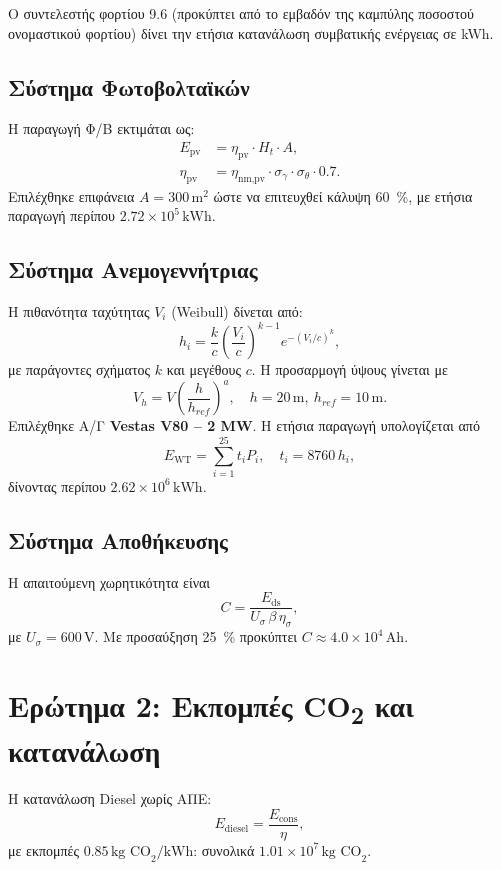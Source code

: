 \documentclass[10pt,a4paper]{article}
\begin{document}
Ο συντελεστής φορτίου 9.6 (προκύπτει από το εμβαδόν της καμπύλης ποσοστού ονομαστικού φορτίου) δίνει την ετήσια κατανάλωση συμβατικής ενέργειας σε kWh.

\subsection{Σύστημα Φωτοβολταϊκών}
Η παραγωγή Φ/Β εκτιμάται ως:
\begin{align}
E_{\text{pv}} &= \eta_{\text{pv}} \cdot H_t \cdot A,\\
\eta_{\text{pv}} &= \eta_{\text{nm,pv}} \cdot \sigma_\gamma \cdot \sigma_\theta \cdot 0.7.
\end{align}
Επιλέχθηκε επιφάνεια $A=300\,\text{m}^2$ ώστε να επιτευχθεί κάλυψη \SI{60}{\percent}, με ετήσια παραγωγή περίπου $2.72\times 10^{5}\,\text{kWh}$.

\subsection{Σύστημα Ανεμογεννήτριας}
Η πιθανότητα ταχύτητας $V_i$ (Weibull) δίνεται από:
\begin{equation}
h_i = \frac{k}{c}\left(\frac{V_i}{c}\right)^{k-1} e^{-(V_i/c)^k},
\end{equation}
με παράγοντες σχήματος $k$ και μεγέθους $c$. Η προσαρμογή ύψους γίνεται με
\begin{equation}
V_h = V \left(\frac{h}{h_{ref}}\right)^a, \quad h=20\,\text{m},\ h_{ref}=10\,\text{m}.
\end{equation}
Επιλέχθηκε Α/Γ \textbf{Vestas V80 -- 2 MW}. Η ετήσια παραγωγή υπολογίζεται από
\begin{equation}
E_{\text{WT}} = \sum_{i=1}^{25} t_i P_i, \quad t_i = 8760\,h_i,
\end{equation}
δίνοντας περίπου $2.62\times 10^{6}\,\text{kWh}$.

\subsection{Σύστημα Αποθήκευσης}
Η απαιτούμενη χωρητικότητα είναι
\begin{equation}
C = \frac{E_{\text{ds}}}{U_{\sigma}\,\beta\,\eta_{\sigma}},
\end{equation}
με $U_{\sigma}=600\,\text{V}$. Με προσαύξηση \SI{25}{\percent} προκύπτει $C\approx 4.0\times 10^{4}\,\text{Ah}$.

\section{Ερώτημα 2: Εκπομπές CO\textsubscript{2} και κατανάλωση}
Η κατανάλωση Diesel χωρίς ΑΠΕ:
\begin{equation}
E_{\text{diesel}} = \frac{E_{\text{cons}}}{\eta},
\end{equation}
με εκπομπές $0.85\,\text{kg CO}_2/\text{kWh}$: συνολικά $1.01\times 10^{7}\,\text{kg CO}_2$.
\end{document}
